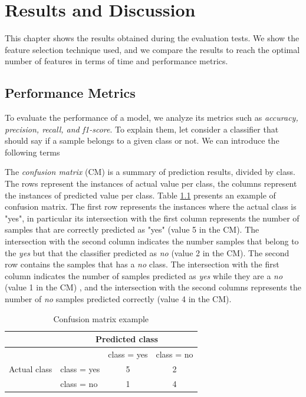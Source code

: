 \chapter{Results and Discussion}
\label{ch:disc}

This chapter shows the results obtained during the evaluation tests. We show the feature selection technique used, and we compare the results to reach the optimal number of features in terms of time and performance metrics.

\section{Performance Metrics}

To evaluate the performance of a model, we analyze its metrics such as \textit{accuracy, precision, recall, and f1-score}. To explain them, let consider a classifier that should say if a sample belongs to a given class or not. We can introduce the following terms

The \textit{confusion matrix} (CM) is a summary of prediction results, divided by class. The rows represent the instances of actual value per class, the columns represent the instances of predicted value per class. Table \ref{tab:cm} presents an example of confusion matrix. The first row represents the instances where the actual class is "yes", in particular its intersection with the first column represents the number of samples that are correctly predicted as "yes" (value 5 in the CM). The intersection with the second
column indicates the number samples that belong to the \textit{yes} but that the classifier predicted as \textit{no} (value 2 in the CM). The second row contains the samples that has a \textit{no} class. The intersection with the first column indicates the number of samples predicted as \textit{yes} while they are a \textit{no} (value 1 in the CM) , and the intersection with the second columns represents the number of \textit{no} samples predicted correctly (value 4 in the CM).
\begin{table}[h]
	\centering
	\caption{Confusion matrix example}
	\label{tab:cm}
	\begin{tabular}{|l|l|c|c|}
		\hline
		& \multicolumn{3}{c|}{Predicted class}                                             \\ \hline
		\multirow{3}{*}{Actual class} &             & \multicolumn{1}{l|}{class = yes} & \multicolumn{1}{l|}{class = no} \\ \cline{2-4} 
		& class = yes & 5                                & 2                               \\ \cline{2-4} 
		& class = no  & 1                                & 4                               \\ \hline
	\end{tabular}
\end{table}

